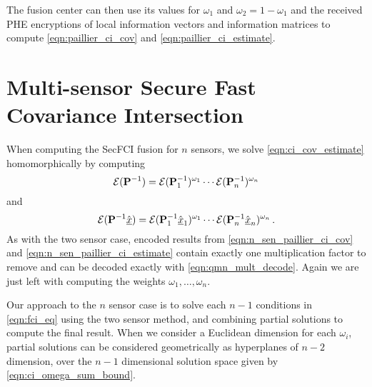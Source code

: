 \documentclass[letterpaper, 10 pt, conference]{ieeeconf}  %
\providecommand{\DIFadd}[1]{{\protect\color{blue}\uwave{#1}}} %
\providecommand{\DIFaddbegin}{} %
\providecommand{\DIFaddend}{} %
\begin{document}
The fusion center can then use its values for $\omega_1$ and $\omega_2 = 1-\omega_1$ and the received PHE encryptions of local information vectors and information matrices to compute \eqref{eqn:paillier_ci_cov} and \eqref{eqn:paillier_ci_estimate}.




\section{Multi-sensor Secure Fast Covariance Intersection} \label{sec:multi_secfci}
When computing the SecFCI fusion for $n$ sensors, we solve \eqref{eqn:ci_cov_estimate} homomorphically by computing
\begin{equation}
   \mathcal{E}({{\mathbf{P}}}^{-1}) = \mathcal{E}({{\mathbf{P}}}^{-1}_1)^{\omega_1}\cdots\mathcal{E}({{\mathbf{P}}}^{-1}_n)^{\omega_n} \label{eqn:n_sen_paillier_ci_cov}
\end{equation}
and
\begin{equation}
   \mathcal{E}({{\mathbf{P}}}^{-1}\hat{{\underline{x}}}) = \mathcal{E}({{\mathbf{P}}}^{-1}_1\hat{{\underline{x}}}_1)^{\omega_1}\cdots\mathcal{E}({{\mathbf{P}}}^{-1}_n\hat{{\underline{x}}}_n)^{\omega_n}\,. \label{eqn:n_sen_paillier_ci_estimate}
\end{equation}
As with the two sensor case, encoded results from \eqref{eqn:n_sen_paillier_ci_cov} and \eqref{eqn:n_sen_paillier_ci_estimate} contain exactly one multiplication factor to remove and can be decoded exactly with \eqref{eqn:qmn_mult_decode}. Again we are just left with computing the \DIFaddbegin \DIFadd{plaintext }\DIFaddend weights $\omega_1,\dots,\omega_n$.

Our approach to the $n$ sensor case is to solve each $n-1$ conditions in \eqref{eqn:fci_eq} using the two sensor method, and combining partial solutions to compute the final result. When we consider a Euclidean dimension for each $\omega_i$, partial solutions can be considered geometrically as hyperplanes of $n-2$ dimension, over the $n-1$ dimensional solution space given by \eqref{eqn:ci_omega_sum_bound}. 
\end{document}
